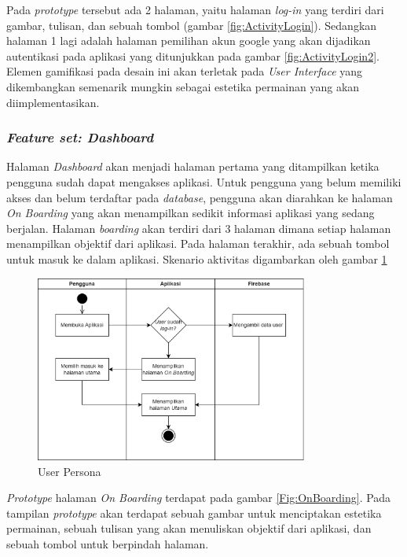 Pada \textit{prototype} tersebut ada 2 halaman, yaitu halaman \textit{log-in} yang terdiri dari gambar, tulisan, dan sebuah tombol (gambar \ref*{fig:ActivityLogin}).
Sedangkan halaman 1 lagi adalah halaman pemilihan akun google yang akan dijadikan autentikasi pada aplikasi yang ditunjukkan pada gambar \ref*{fig:ActivityLogin2}.
Elemen gamifikasi pada desain ini akan terletak pada \textit{User Interface} yang dikembangkan semenarik mungkin sebagai estetika permainan yang akan diimplementasikan. 

\subsubsection{\textit{Feature set: Dashboard}}
Halaman \textit{Dashboard} akan menjadi halaman pertama yang ditampilkan ketika pengguna sudah dapat mengakses aplikasi.
Untuk pengguna yang belum memiliki akses dan belum terdaftar pada \textit{database}, pengguna akan diarahkan ke halaman \textit{On Boarding} yang akan menampilkan sedikit informasi aplikasi yang sedang berjalan.
Halaman \textit{boarding} akan terdiri dari 3 halaman dimana setiap halaman menampilkan objektif dari aplikasi.
Pada halaman terakhir, ada sebuah tombol untuk masuk ke dalam aplikasi. Skenario aktivitas digambarkan oleh gambar \ref*{Fig:ActivityMain}
\begin{figure}[H]
	\centering
	\includegraphics[width=0.8\textwidth]{contents/chapter-3/images/AD-halamanutama.png}
	\caption{User Persona}
	\label{Fig:ActivityMain}
\end{figure}
\textit{Prototype} halaman \textit{On Boarding} terdapat pada gambar \ref*{Fig:OnBoarding}. Pada tampilan \textit{prototype} akan terdapat sebuah gambar untuk menciptakan estetika permainan,
sebuah tulisan yang akan menuliskan objektif dari aplikasi, dan sebuah tombol untuk berpindah halaman.
